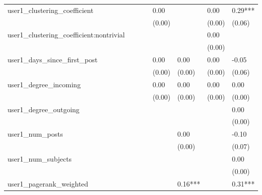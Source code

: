 \begin{table}
\begin{center}
\begin{tabular}{llllllll}
user1_clustering_coefficient                   &          &            &         & 0.00    &          & 0.00               & 0.29***  \\
                                               &          &            &         & (0.00)  &          & (0.00)             & (0.06)   \\
user1_clustering_coefficient:nontrivial        &          &            &         &         &          & 0.00               &          \\
                                               &          &            &         &         &          & (0.00)             &          \\
user1_days_since_first_post                    &          &            &         & 0.00    & 0.00     & 0.00               & -0.05    \\
                                               &          &            &         & (0.00)  & (0.00)   & (0.00)             & (0.06)   \\
user1_degree_incoming                          &          &            &         & 0.00    & 0.00     & 0.00               & 0.00     \\
                                               &          &            &         & (0.00)  & (0.00)   & (0.00)             & (0.00)   \\
user1_degree_outgoing                          &          &            &         &         &          &                    & 0.00     \\
                                               &          &            &         &         &          &                    & (0.00)   \\
user1_num_posts                                &          &            &         &         & 0.00     &                    & -0.10    \\
                                               &          &            &         &         & (0.00)   &                    & (0.07)   \\
user1_num_subjects                             &          &            &         &         &          &                    & 0.00     \\
                                               &          &            &         &         &          &                    & (0.00)   \\
user1_pagerank_weighted                        &          &            &         &         & 0.16***  &                    & 0.31***  \\

\end{tabular}
\end{center}
\end{table}
